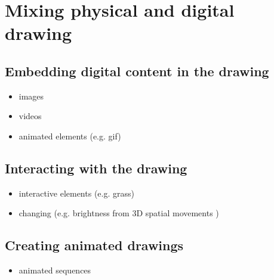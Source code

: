 \documentclass{sigchi}
\begin{document}



\section{Mixing physical and digital drawing}

\subsection{Embedding digital content in the drawing}
\begin{itemize}
  \item images
  \item videos 
  \item animated elements (e.g. gif) 
\end{itemize}

\subsection{Interacting with the drawing}
\begin{itemize}
  \item interactive elements (e.g. grass)
  \item changing (e.g. brightness from 3D spatial movements ) 
\end{itemize}

\subsection{Creating animated drawings}
\begin{itemize}
  \item animated sequences 
\end{itemize}
\end{document}
